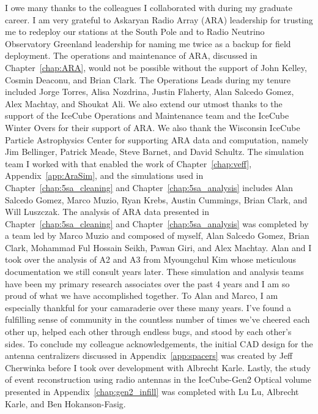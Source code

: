 I owe many thanks to the colleagues I collaborated with during my graduate career. 
I am very grateful to Askaryan Radio Array (ARA) leadership for trusting me to redeploy our stations at the South Pole and to Radio Neutrino Observatory Greenland leadership for naming me twice as a backup for field deployment.
The operations and maintenance of ARA, discussed in Chapter~\ref{chap:ARA}, would not be possible without the support of John Kelley, Cosmin Deaconu, and Brian Clark. 
The Operations Leads during my tenure included Jorge Torres, Alisa Nozdrina, Justin Flaherty, Alan Salcedo Gomez, Alex Machtay, and Shoukat Ali. 
We also extend our utmost thanks to the support of the IceCube Operations and Maintenance team and the IceCube Winter Overs for their support of ARA.
We also thank the Wisconsin IceCube Particle Astrophysics Center for supporting ARA data and computation, namely Jim Bellinger, Patrick Meade, Steve Barnet, and David Schultz. 
The simulation team I worked with that enabled the work of Chapter~\ref{chap:veff}, Appendix~\ref{app:AraSim}, and the simulations used in Chapter~\ref{chap:5sa_cleaning} and Chapter~\ref{chap:5sa_analysis} includes Alan Salcedo Gomez, Marco Muzio, Ryan Krebs, Austin Cummings, Brian Clark, and Will Luszczak.
The analysis of ARA data presented in Chapter~\ref{chap:5sa_cleaning} and Chapter~\ref{chap:5sa_analysis} was completed by a team led by Marco Muzio and composed of myself, Alan Salcedo Gomez, Brian Clark, Mohammad Ful Hossain Seikh, Pawan Giri, and Alex Machtay. 
Alan and I took over the analysis of A2 and A3 from Myoungchul Kim whose meticulous documentation we still consult years later.
These simulation and analysis teams have been my primary research associates over the past 4 years and I am so proud of what we have accomplished together.
To Alan and Marco, I am especially thankful for your camaraderie over these many years.
I've found a fulfilling sense of community in the countless number of times we've cheered each other up, helped each other through endless bugs, and stood by each other's sides.
To conclude my colleague acknowledgements, the initial CAD design for the antenna centralizers discussed in Appendix~\ref{app:spacers} was created by Jeff Cherwinka before I took over development with Albrecht Karle.
Lastly, the study of event reconstruction using radio antennas in the IceCube-Gen2 Optical volume presented in Appendix~\ref{chap:gen2_infill} was completed with Lu Lu, Albrecht Karle, and Ben Hokanson-Fasig.

